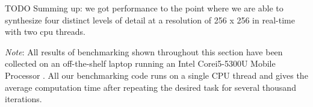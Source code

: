 TODO Summing up: we got performance to the point where we are able to synthesize four
distinct levels of detail at a resolution of 256 x 256 in real-time with two
cpu threads. 


\emph{Note}: All results of benchmarking shown throughout this section
have been collected on an off-the-shelf laptop running an Intel\textregistered
Core\texttrademark i5-5300U Mobile Processor \citep{intel:5300u}.
All our benchmarking code runs on a single CPU thread and gives the average
computation time after repeating the desired task for several thousand iterations.
%
